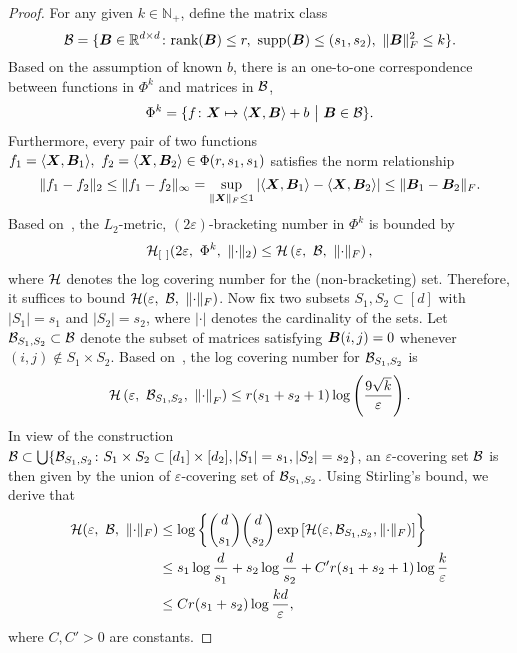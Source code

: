 \documentclass[11pt]{article}
\theoremstyle{plain}
\theoremstyle{definition}
\begin{document}
\begin{proof} 
For any given $k\in\mathbb{N}_{+}$, define the matrix class
\[
\tB=\{\mB\in \mathbb{R}^{d\times d}\colon \text{rank}(\mB)\leq r,\ \text{supp}(\mB)\leq (s_1,s_2),\ \FnormSize{}{\mB}^2\leq k\}.
\]
Based on the assumption of known $b$, there is an one-to-one correspondence between functions in $\Phi^k$ and matrices in $\mathcal{B}$,
\[
\Phi^k=\{f\colon\bm X\mapsto\langle \bm X,\bm B\rangle+b\ \big| \ \bm B\in \mathcal{B}\}.
\]
Furthermore, every pair of two functions $f_1=\langle\bm X, \bm B_1\rangle,\ f_2=\langle \bm X,\bm B_2\rangle\in\Phi(r,s_1,s_1)$ satisfies the norm relationship
\[
\lVert f_1-f_2\rVert_2\leq \lVert f_1-f_2\rVert_\infty =\sup_{\lVert\bm X\rVert_F\leq 1}|\langle \bm X,\bm B_1\rangle -\langle \bm X,\bm B_2\rangle  |\leq \lVert\bm B_1-\bm B_2\rVert_F.
\]
Based on~\citet[Theorem 9.23]{kosorok2007introduction}, the $L_2$-metric, $(2\varepsilon)$-bracketing number in $\Phi^k$ is bounded by
\[
\tH_{[\ ]}(2\varepsilon,\ \Phi^k,\ \vnormSize{}{\cdot}) \leq \tH \left(\varepsilon,\ \tB,\ \FnormSize{}{\cdot}\right),
\]
where $\mathcal{H}$ denotes the log covering number for the (non-bracketing) set. Therefore, it suffices to bound $\tH(\varepsilon,\ \tB,\ \FnormSize{}{\cdot})$. Now fix two subsets $S_1,S_2\subset [d]$ with $|S_1|=s_1$ and $|S_2|=s_2$, where $|\cdot|$ denotes the cardinality of the sets. Let $\mathcal{B}_{S_1,S_2}\subset \mathcal{B}$ denote the subset of matrices satisfying $\bm B(i,j)=0$ whenever $(i,j)\notin S_1\times S_2$. Based on~\citet[Lemma 3.1]{candes2011tight}, the log covering number for $\mathcal{B}_{S_1,S_2}$ is
\[
\tH \left(\varepsilon,\ \tB_{S_1,S_2},\ \Fnorm{\cdot}\right)\leq r(s_1+s_2+1)\log\left({9\sqrt{k}\over \varepsilon}\right).
\]
In view of the construction $\mathcal{B}\subset\bigcup\{\mathcal{B}_{S_1,S_2}\colon S_1\times S_2\subset [d_1]\times[d_2], |S_1|=s_1, |S_2|=s_2\}$, an $\varepsilon$-covering set $\mathcal{B}$ is then given by the union of $\varepsilon$-covering set of $\mathcal{B}_{S_1,S_2}$. Using Stirling's bound, we derive that 
\begin{align}
\mathcal{H}(\varepsilon,\ \mathcal{B},\ \lVert\cdot\rVert_F)&\leq \log \left\{{d \choose s_1}{d \choose s_2}\exp\left[\mathcal{H}(\varepsilon,\mathcal{B}_{S_1,S_2},\lVert\cdot\rVert_F)\right]\right\}
\\
&\leq s_1 \log {d\over s_1}+s_2\log {d\over s_2}+C'r(s_1+s_2+1)\log{k\over \varepsilon}\\
& \leq Cr(s_1+s_2)\log{kd\over \varepsilon},
\end{align}
where $C,C'>0$ are constants. 
\end{proof}
\end{document}
